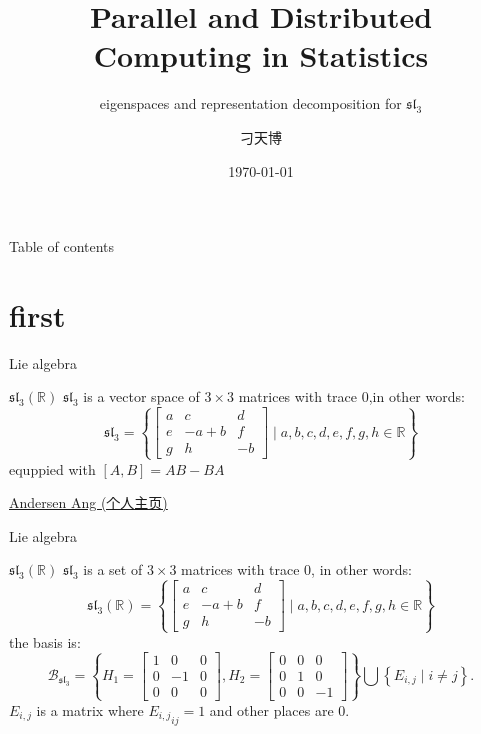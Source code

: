 \documentclass{beamer}
\title{Parallel and Distributed Computing in Statistics}
\subtitle{eigenspaces and representation decomposition for $\mathfrak{sl}_3$}
\date{\today}
\author{刁天博}
\institute[CCNU]{
	School of Mathematics and Statistics\\
	Central China Normal University}
\newcommand{\R}{\mathbb{R}}
\newcounter{mytheorem}[section]
\begin{document}
	
\begin{frame}
\titlepage
\end{frame}   %

\begin{frame}{Table of contents}
\tableofcontents
\end{frame}	             %


\section{first}

\begin{frame}{Lie algebra}
\begin{exam}{$\mathfrak{sl}_3(\R)$}{}
$\mathfrak{sl}_{3}$ is a vector space of $3 \times 3$ matrices with trace 0,in other words:  \[
\mathfrak{sl}_{3} = \left\{ \begin{bmatrix} a & c & d \\
	e & -a+b & f \\ g & h & -b\end{bmatrix} \mid a,b,c,d,e,f,g,h \in \R \right\} 
		\] equppied with $[A,B] = AB - BA$
\end{exam}
\href{https://angms.science/index.html}{Andersen Ang (个人主页)}
\end{frame}


\addtocounter{mytheorem}{-1}
\begin{frame}{Lie algebra}
\begin{exam}{$\mathfrak{sl}_3(\R)$}{}
	$\mathfrak{sl}_{3}$ is a set of $3 \times 3$ matrices with trace 0, in other words:  \[
		\mathfrak{sl}_{3}(\R) = \left\{ \begin{bmatrix} a & c & d \\
		e & -a+b & f \\ g & h & -b\end{bmatrix} \mid a,b,c,d,e,f,g,h \in \R \right\} 
	\] 
\tcblower
the basis is: \[
	\mathcal{B}_{\mathfrak{sl}_{3}} = \left\{ H_1 = \begin{bmatrix} 1 & 0 &0 \\ 0 & -1 & 0 \\ 0 &0 &0 \end{bmatrix}, H_2 = \begin{bmatrix} 0 &0 &0 \\ 0 &1&0 \\ 0&0&-1 \end{bmatrix}   \right\} \bigcup \left\{ E_{i,j} \mid i \neq j\right\}. 
\] $E_{i,j}$ is a matrix where ${E_{i,j}}_{ij} = 1$ and other places are $0$.
\end{exam}
\end{frame}
\end{document}
